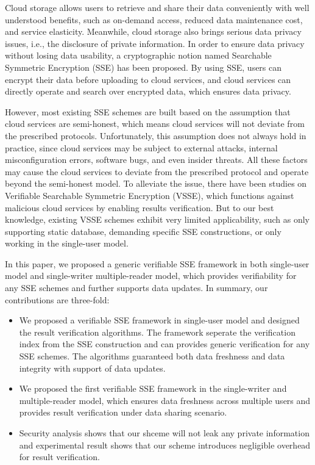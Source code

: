 \begin{eabstract}
  Cloud storage allows users to retrieve and share their data conveniently with well understood benefits, such as on-demand access, reduced data maintenance cost, and service elasticity.
  Meanwhile, cloud storage also brings serious data privacy issues, i.e., the disclosure of private information. In order to ensure data privacy without losing data usability,
  a cryptographic notion named
  Searchable Symmetric Encryption (SSE) has been proposed. By using SSE, users can encrypt their data before uploading to cloud services, and cloud services can directly operate and search over encrypted data, which ensures data privacy.

  However, most existing SSE schemes are built based on the assumption that cloud services are semi-honest, which means cloud services will not deviate from the prescribed protocols. Unfortunately, this assumption does not always hold in practice, since cloud services may be subject to external attacks, internal misconfiguration errors, software bugs, and even insider threats. All these factors may cause the cloud services to deviate from the prescribed protocol and operate beyond the semi-honest model.
  To alleviate the issue, there have been studies on Verifiable Searchable Symmetric Encryption (VSSE), which functions against malicious cloud services by enabling results verification. But to our best knowledge, existing VSSE schemes exhibit very limited applicability, such as only supporting static database, demanding specific SSE constructions, or only working in the single-user model.

  In this paper, we proposed a generic verifiable SSE framework in both single-user model and single-writer multiple-reader model, which provides verifiability for any SSE schemes and further supports data updates. In summary, our contributions are three-fold:
  \begin{itemize}
    \item We proposed a verifiable SSE framework in single-user model and designed the result verification algorithms. The framework seperate the verification index from the SSE construction and can provides generic verification for any SSE schemes. The algorithms guaranteed both data freshness and data integrity with support of data updates.
    \item We proposed the first verifiable SSE framework in the single-writer and multiple-reader model, which ensures data freshness across multiple users and provides result verification under data sharing scenario.
    \item Security analysis shows that our shceme will not leak any private information and experimental result shows that our scheme introduces negligible overhead for result verification.
  \end{itemize}
\end{eabstract}

